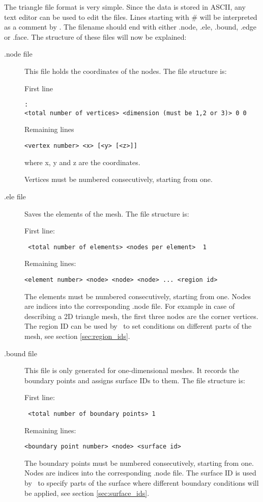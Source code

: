 The triangle file format is very simple. Since the data is stored in ASCII,
any text editor can be used to edit the files.  Lines starting with \# will
be interpreted as a comment by \fluidity.  The filename should end with
either .node, .ele, .bound, .edge or .face.  The structure of these files
will now be explained:

\begin{description}
\item[.node file]
This file holds the coordinates of the nodes. The file structure is:

First line
\begin{lstlisting}: 
<total number of vertices> <dimension (must be 1,2 or 3)> 0 0
\end{lstlisting}
Remaining lines
\begin{lstlisting}
<vertex number> <x> [<y> [<z>]]
\end{lstlisting} 
where x, y and z are the coordinates.

Vertices must be numbered consecutively, starting from one. 

\item[.ele file] Saves the elements of the mesh. The file structure is:

First line:
\begin{lstlisting}
 <total number of elements> <nodes per element>  1
\end{lstlisting}
Remaining lines:
\begin{lstlisting} 
<element number> <node> <node> <node> ... <region id>
\end{lstlisting}  
The elements must be numbered consecutively, starting from one. Nodes are
indices into the corresponding .node file. For example in case of describing
a 2D triangle mesh, the first three nodes are the corner vertices. The
region ID can be used by \fluidity\ to set conditions on different parts of
the mesh, see section \ref{sec:region_ids}.

\item[.bound file] This file is only generated for one-dimensional meshes.
  It records the boundary points and assigns surface IDs to them. The file
  structure is:

First line:
\begin{lstlisting}
 <total number of boundary points> 1
\end{lstlisting}
Remaining lines:
\begin{lstlisting} 
<boundary point number> <node> <surface id>
\end{lstlisting}  
The boundary points must be numbered consecutively, starting from one. Nodes
are indices into the corresponding .node file. The surface ID is used by
\fluidity\ to specify parts of the surface where different boundary
conditions will be applied, see section \ref{sec:surface_ids}.


\end{description}
